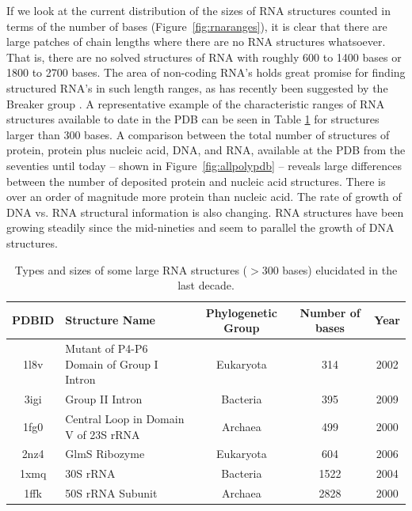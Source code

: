 If we look at the current  distribution of the sizes of RNA structures
counted in terms of  the number of bases (Figure~\ref{fig:rnaranges}),
it is clear that there are  large patches of chain lengths where there
are  no RNA  structures  whatsoever.   That is,  there  are no  solved
structures  of RNA  with roughly  600 to  1400 bases  or 1800  to 2700
bases.  The area  of non-coding RNA's holds great  promise for finding
structured RNA's in such length ranges, as has recently been suggested
by the Breaker group \cite{weinberg2009}.  A representative example of
the characteristic ranges  of RNA structures available to  date in the
PDB can be seen in Table \ref{tab:rnarange} for structures larger than
300  bases. A  comparison between  the total  number of  structures of
protein, protein plus nucleic acid, DNA, and RNA, available at the PDB
from the seventies until today -- shown in Figure~\ref{fig:allpolypdb}
-- reveals large  differences between the number  of deposited protein
and nucleic acid structures.  There is over an order of magnitude more
protein  than  nucleic acid.   The  rate of  growth  of  DNA vs.   RNA
structural  information is  also changing.   RNA structures  have been
growing  steadily since  the  mid-nineties and  seem  to parallel  the
growth of DNA structures.

\begin{table}[htbp]
\begin{center}
{\small
\begin{tabular}{c|p{5cm}|c|c|c}
\hline
\bf{PDBID} & \bf{Structure Name} & \bf{Phylogenetic Group} & \bf{Number of bases} & \bf{Year} \\ \hline
1l8v & Mutant of P4-P6 Domain of Group I Intron & Eukaryota & 314 & 2002 \\ \hline
3igi & Group II Intron & Bacteria & 395 & 2009 \\ \hline
1fg0 & Central Loop in Domain V of 23S rRNA & Archaea & 499 & 2000 \\ \hline
2nz4 & GlmS Ribozyme & Eukaryota & 604 & 2006 \\ \hline
1xmq & 30S rRNA & Bacteria & 1522 & 2004 \\ \hline
1ffk & 50S rRNA Subunit & Archaea & 2828 & 2000 \\ \hline
\end{tabular}
}
\caption{Types and  sizes of some large RNA  structures ($>$300 bases)
  elucidated in the last decade.}
\end{center}
\label{tab:rnarange}
\end{table}

